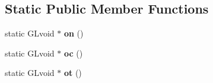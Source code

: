 \subsection*{Static Public Member Functions}
\begin{DoxyCompactItemize}
\item 
\hypertarget{structvsr_1_1_vertex_a76830cb0c5fe3a82bc6e7236765b5b81}{static G\-Lvoid $\ast$ {\bfseries on} ()}\label{structvsr_1_1_vertex_a76830cb0c5fe3a82bc6e7236765b5b81}

\item 
\hypertarget{structvsr_1_1_vertex_ae65f62b90dc88394f47b4511844a605b}{static G\-Lvoid $\ast$ {\bfseries oc} ()}\label{structvsr_1_1_vertex_ae65f62b90dc88394f47b4511844a605b}

\item 
\hypertarget{structvsr_1_1_vertex_ab694d33358a99eef0efadaf5d3772ebf}{static G\-Lvoid $\ast$ {\bfseries ot} ()}\label{structvsr_1_1_vertex_ab694d33358a99eef0efadaf5d3772ebf}

\end{DoxyCompactItemize}
